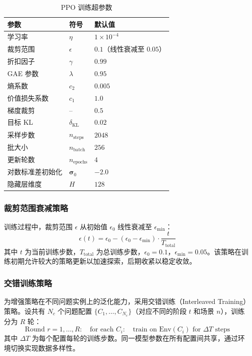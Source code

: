 \documentclass[11pt]{ctexart}
\begin{document}
\begin{table}[h]
\centering
\begin{tabular}{lll}
\hline
\textbf{参数} & \textbf{符号} & \textbf{默认值} \\
\hline
学习率 & $\eta$ & $1 \times 10^{-4}$ \\
裁剪范围 & $\epsilon$ & $0.1$（线性衰减至 $0.05$） \\
折扣因子 & $\gamma$ & $0.99$ \\
GAE 参数 & $\lambda$ & $0.95$ \\
熵系数 & $c_2$ & $0.005$ \\
价值损失系数 & $c_1$ & $1.0$ \\
梯度裁剪 & -- & $0.5$ \\
目标 KL & $\delta_{\text{KL}}$ & $0.02$ \\
采样步数 & $n_{\text{steps}}$ & $2048$ \\
批大小 & $n_{\text{batch}}$ & $256$ \\
更新轮数 & $n_{\text{epochs}}$ & $4$ \\
对数标准差初始化 & $\boldsymbol{\sigma}_0$ & $-2.0$ \\
隐藏层维度 & $H$ & $128$ \\
\hline
\end{tabular}
\caption{PPO 训练超参数}
\end{table}

\subsubsection{裁剪范围衰减策略}

训练过程中，裁剪范围 $\epsilon$ 从初始值 $\epsilon_0$ 线性衰减至 $\epsilon_{\min}$：
\begin{equation}
\epsilon(t) = \epsilon_0 - (\epsilon_0 - \epsilon_{\min}) \cdot \frac{t}{T_{\text{total}}}
\end{equation}
其中 $t$ 为当前训练步数，$T_{\text{total}}$ 为总训练步数，$\epsilon_0 = 0.1$，$\epsilon_{\min} = 0.05$。该策略在训练初期允许较大的策略更新以加速探索，后期收紧以稳定收敛。

\subsubsection{交错训练策略}

为增强策略在不同问题实例上的泛化能力，采用交错训练（Interleaved Training）策略。设共有 $N_c$ 个问题配置 $\{C_1, \ldots, C_{N_c}\}$（对应不同的阶段 $t$ 和场景 $n$），训练分为 $R$ 轮：
\begin{equation}
\text{Round } r = 1, \ldots, R: \quad \text{for each } C_i: \quad \text{train on } \mathrm{Env}(C_i) \text{ for } \Delta T \text{ steps}
\end{equation}
其中 $\Delta T$ 为每个配置每轮的训练步数。同一模型参数在所有配置间共享，通过环境切换实现数据多样性。
\end{document}

